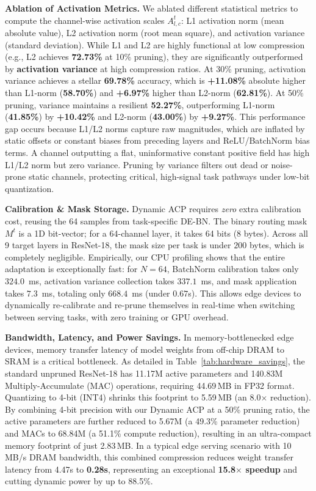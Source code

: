 \documentclass{article}
\theoremstyle{plain}
\theoremstyle{definition}
\theoremstyle{remark}
\begin{document}
\textbf{Ablation of Activation Metrics.} We ablated different statistical metrics to compute the channel-wise activation scales $A^t_{l, c}$: L1 activation norm (mean absolute value), L2 activation norm (root mean square), and activation variance (standard deviation). While L1 and L2 are highly functional at low compression (e.g., L2 achieves \textbf{72.73\%} at 10\% pruning), they are significantly outperformed by \textbf{activation variance} at high compression ratios. At 30\% pruning, activation variance achieves a stellar \textbf{69.78\%} accuracy, which is \textbf{+11.08\%} absolute higher than L1-norm (\textbf{58.70\%}) and \textbf{+6.97\%} higher than L2-norm (\textbf{62.81\%}). At 50\% pruning, variance maintains a resilient \textbf{52.27\%}, outperforming L1-norm (\textbf{41.85\%}) by \textbf{+10.42\%} and L2-norm (\textbf{43.00\%}) by \textbf{+9.27\%}. This performance gap occurs because L1/L2 norms capture raw magnitudes, which are inflated by static offsets or constant biases from preceding layers and ReLU/BatchNorm bias terms. A channel outputting a flat, uninformative constant positive field has high L1/L2 norm but zero variance. Pruning by variance filters out dead or noise-prone static channels, protecting critical, high-signal task pathways under low-bit quantization.

\textbf{Calibration \& Mask Storage.} Dynamic ACP requires \textit{zero} extra calibration cost, reusing the 64 samples from task-specific DE-BN. The binary routing mask $M^t$ is a 1D bit-vector; for a 64-channel layer, it takes 64 bits (8 bytes). Across all 9 target layers in ResNet-18, the mask size per task is under $200$ bytes, which is completely negligible. Empirically, our CPU profiling shows that the entire adaptation is exceptionally fast: for $N=64$, BatchNorm calibration takes only $324.0$~ms, activation variance collection takes $337.1$~ms, and mask application takes $7.3$~ms, totaling only $668.4$~ms (under $0.67$s). This allows edge devices to dynamically re-calibrate and re-prune themselves in real-time when switching between serving tasks, with zero training or GPU overhead.

\textbf{Bandwidth, Latency, and Power Savings.} In memory-bottlenecked edge devices, memory transfer latency of model weights from off-chip DRAM to SRAM is a critical bottleneck. As detailed in Table~\ref{tab:hardware_savings}, the standard unpruned ResNet-18 has 11.17M active parameters and 140.83M Multiply-Accumulate (MAC) operations, requiring 44.69\,MB in FP32 format. Quantizing to 4-bit (INT4) shrinks this footprint to 5.59\,MB (an 8.0$\times$ reduction). By combining 4-bit precision with our Dynamic ACP at a 50\% pruning ratio, the active parameters are further reduced to 5.67M (a 49.3\% parameter reduction) and MACs to 68.84M (a 51.1\% compute reduction), resulting in an ultra-compact memory footprint of just 2.83\,MB. In a typical edge serving scenario with 10\,MB/s DRAM bandwidth, this combined compression reduces weight transfer latency from 4.47s to \textbf{0.28s}, representing an exceptional \textbf{15.8$\times$ speedup} and cutting dynamic power by up to 88.5\%.
\end{document}
